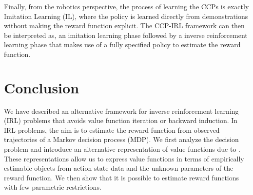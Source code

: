 \documentclass{article}
\begin{document}
Finally, from the robotics perspective, the process of learning the CCPs is exactly Imitation Learning (IL), where the policy is learned directly from demonstrations without making the reward function explicit. The CCP-IRL framework can then be interpreted as, an imitation learning phase followed by a inverse reinforcement learning phase that makes use of a fully specified policy to estimate the reward function.

\section{Conclusion}


We have described an alternative framework for inverse reinforcement learning (IRL) problems that avoids value function iteration or backward induction. In IRL problems, the aim is to estimate the reward function from observed trajectories of a Markov decision process (MDP). We first analyze the decision problem and introduce an alternative representation of value functions due to \cite{hotz}. These representations allow us to express value functions in terms of empirically estimable objects from action-state data and the unknown parameters of the reward function. We then show that it is possible to estimate reward functions with few parametric restrictions. 











\end{document}
